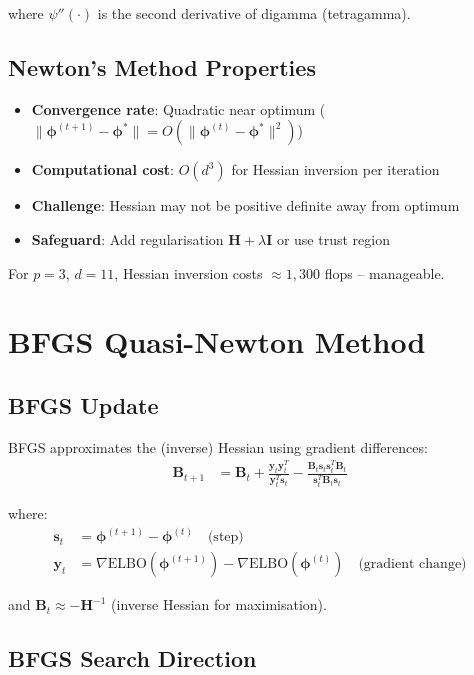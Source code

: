 \documentclass[11pt]{article}
\newcommand{\ELBO}{\text{ELBO}}
\begin{document}
where $\psi''(\cdot)$ is the second derivative of digamma (tetragamma).

\subsection{Newton's Method Properties}

\begin{itemize}
\item \textbf{Convergence rate}: Quadratic near optimum ($\|\bm{\phi}^{(t+1)} - \bm{\phi}^*\| = O(\|\bm{\phi}^{(t)} - \bm{\phi}^*\|^2)$)
\item \textbf{Computational cost}: $O(d^3)$ for Hessian inversion per iteration
\item \textbf{Challenge}: Hessian may not be positive definite away from optimum
\item \textbf{Safeguard}: Add regularisation $\bm{H} + \lambda \bm{I}$ or use trust region
\end{itemize}

For $p=3$, $d=11$, Hessian inversion costs $\approx 1,300$ flops -- manageable.

\section{BFGS Quasi-Newton Method}

\subsection{BFGS Update}

BFGS approximates the (inverse) Hessian using gradient differences:
\begin{align}
\bm{B}_{t+1} &= \bm{B}_t + \frac{\bm{y}_t \bm{y}_t^T}{\bm{y}_t^T \bm{s}_t} - \frac{\bm{B}_t \bm{s}_t \bm{s}_t^T \bm{B}_t}{\bm{s}_t^T \bm{B}_t \bm{s}_t}
\end{align}

where:
\begin{align}
\bm{s}_t &= \bm{\phi}^{(t+1)} - \bm{\phi}^{(t)} \quad \text{(step)}\\
\bm{y}_t &= \nabla \ELBO(\bm{\phi}^{(t+1)}) - \nabla \ELBO(\bm{\phi}^{(t)}) \quad \text{(gradient change)}
\end{align}

and $\bm{B}_t \approx -\bm{H}^{-1}$ (inverse Hessian for maximisation).

\subsection{BFGS Search Direction}
\end{document}
